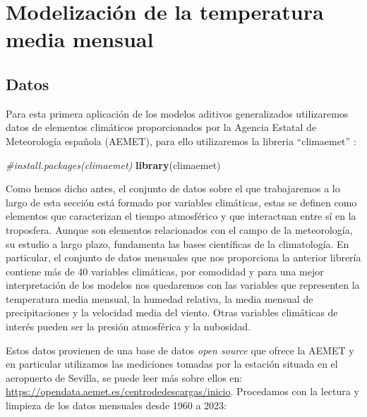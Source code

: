 \documentclass[12pt,a4paper,]{book}
\newenvironment{Shaded}{\begin{snugshade}}{\end{snugshade}}
\newcommand{\CommentTok}[1]{\textcolor[rgb]{0.56,0.35,0.01}{\textit{#1}}}
\newcommand{\FunctionTok}[1]{\textcolor[rgb]{0.13,0.29,0.53}{\textbf{#1}}}
\newcommand{\NormalTok}[1]{#1}
\numberwithin{dummy}{section}
\theoremstyle{ocrenumbox}
\theoremstyle{blacknumex}
\theoremstyle{blacknumbox}
\theoremstyle{ocrenum}
\theoremstyle{ocrenum}
\begin{document}
\hypertarget{modelizaciuxf3n-de-la-temperatura-media-mensual}{%
\section{Modelización de la temperatura media
mensual}\label{modelizaciuxf3n-de-la-temperatura-media-mensual}}

\hypertarget{datos}{%
\subsection{Datos}\label{datos}}

Para esta primera aplicación de los modelos aditivos generalizados
utilizaremos datos de elementos climáticos proporcionados por la Agencia
Estatal de Meteorología española (AEMET), para ello utilizaremos la
libreria ``climaemet'' \citet{climaemet}:

\begin{Shaded}
\begin{Highlighting}[]
\CommentTok{\#install.packages(\textquotesingle{}climaemet\textquotesingle{})}
\FunctionTok{library}\NormalTok{(climaemet)}
\end{Highlighting}
\end{Shaded}

Como hemos dicho antes, el conjunto de datos sobre el que trabajaremos a
lo largo de esta sección está formado por variables climáticas, estas se
definen como elementos que caracterizan el tiempo atmosférico y que
interactuan entre sí en la troposfera. Aunque son elementos relacionados
con el campo de la meteorología, su estudio a largo plazo, fundamenta
las bases científicas de la climatología. En particular, el conjunto de
datos mensuales que nos proporciona la anterior librería contiene más de
40 variables climáticas, por comodidad y para una mejor interpretación
de los modelos nos quedaremos con las variables que representen la
temperatura media mensual, la humedad relativa, la media mensual de
precipitaciones y la velocidad media del viento. Otras variables
climáticas de interés pueden ser la presión atmosférica y la nubosidad.

Estos datos provienen de una base de datos \emph{open source} que ofrece
la AEMET y en particular utilizamos las mediciones tomadas por la
estación situada en el aeropuerto de Sevilla, se puede leer más sobre
ellos en: \url{https://opendata.aemet.es/centrodedescargas/inicio}.
Procedamos con la lectura y limpieza de los datos mensuales desde 1960 a
2023:
\end{document}
